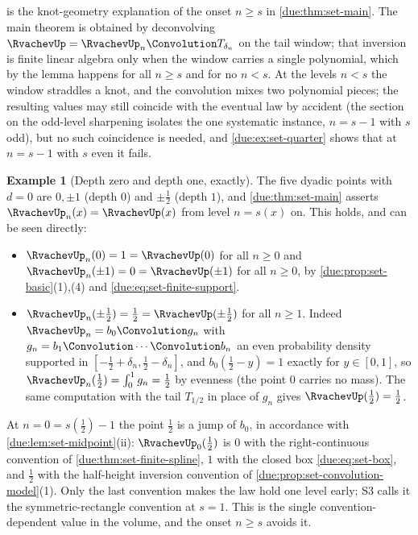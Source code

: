 \documentclass[11pt,oneside]{article}
\theoremstyle{plain}
\theoremstyle{definition}
\newtheorem{example}[theorem]{Example}
\theoremstyle{remark}
\newcommand{\upn}[1]{\RvachevUp_{#1}}
\newcommand{\dep}[1]{s\!\left(#1\right)}                    %
\begin{document}
 is the knot-geometry explanation of the onset
$n\ge s$ in \cref{due:thm:set-main}.  The main theorem is obtained by
deconvolving $\RvachevUp=\upn{n}\Convolution T_{\delta_n}$ on the tail
window; that inversion is finite linear algebra only when the window
carries a single polynomial, which by the lemma happens for all $n\ge s$
and for no $n<s$.  At the levels $n<s$ the window straddles a knot, and
the convolution mixes two polynomial pieces; the resulting values may
still coincide with the eventual law by accident (the section on the
odd-level sharpening isolates the one systematic instance, $n=s-1$ with
$s$ odd), but no such coincidence is needed, and \cref{due:ex:set-quarter}
shows that at $n=s-1$ with $s$ even it fails.

\begin{example}[Depth zero and depth one, exactly]
\label{due:ex:set-low-depth}
The five dyadic points with $d=0$ are $0,\pm1$ (depth $0$) and
$\pm\frac12$ (depth $1$), and \cref{due:thm:set-main} asserts
$\upn{n}(x)=\RvachevUp(x)$ from level $n=\dep{x}$ on.  This holds, and can
be seen directly:
\begin{itemize}
\item $\upn{n}(0)=1=\RvachevUp(0)$ for all $n\ge0$ and
      $\upn{n}(\pm1)=0=\RvachevUp(\pm1)$ for all $n\ge0$, by
      \cref{due:prop:set-basic}(1),(4) and \cref{due:eq:set-finite-support}.
\item $\upn{n}(\pm\tfrac12)=\tfrac12=\RvachevUp(\pm\tfrac12)$ for all
      $n\ge1$.  Indeed $\upn{n}=b_0\Convolution g_n$ with
      $g_n=b_1\Convolution\cdots\Convolution b_n$ an even probability
      density supported in $[-\frac12+\delta_n,\frac12-\delta_n]$, and
      $b_0(\tfrac12-y)=1$ exactly for $y\in[0,1]$, so
      $\upn{n}(\tfrac12)=\int_{0}^{1}g_n=\tfrac12$ by evenness (the point
      $0$ carries no mass).  The same computation with the tail
      $T_{1/2}$ in place of $g_n$ gives $\RvachevUp(\tfrac12)=\tfrac12$.
\end{itemize}
At $n=0=\dep{\frac12}-1$ the point $\frac12$ is a jump of $b_0$, in
accordance with \cref{due:lem:set-midpoint}(ii): $\upn{0}(\tfrac12)$ is
$0$ with the right-continuous convention of
\cref{due:thm:set-finite-spline}, $1$ with the closed box
\cref{due:eq:set-box}, and $\tfrac12$ with the half-height inversion
convention of \cref{due:prop:set-convolution-model}(1).  Only the last
convention makes the law hold one level early; S3 calls it the
symmetric-rectangle convention at $s=1$.  This is the single
convention-dependent value in the volume, and the onset $n\ge s$ avoids it.
\end{example}
\end{document}
